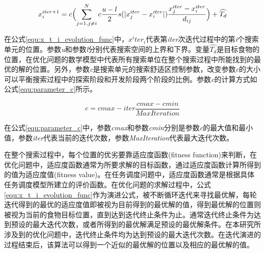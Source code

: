 \begin{equation}\label{equ:x_t_i_evolution_func}
    x^{iter+1}_i = c \Bigl(\sum_{j=1,j\neq{i}}^N c \frac{u-l}{2}s (\lvert x^{iter}_j-x^{iter}_i \rvert )\frac{x^{iter}_j-x^{iter}_i}{d_{ij}} \Bigr) + \widehat{T_d}
\end{equation}

在公式\ref{equ:x_t_i_evolution_func}中，$x^iter_i$代表第\emph{iter}次迭代过程中的第\emph{i}个搜索单元的位置。参数\emph{u}和参数\emph{l}分别代表搜索空间的上界和下界。变量$\widehat{T_d}$是目标食物的位置，在优化问题的数学模型中代表所有搜索单位在整个搜索过程中所能找到的最优的解的位置。另外，参数\emph{c}是搜索单元的搜索舒适区控制参数，改变参数\emph{c}的大小可以平衡搜索过程中的探索阶段和开发阶段两个阶段的比例。参数\emph{c}的计算方式如公式\ref{equ:parameter_c}所示。

\begin{equation}\label{equ:parameter_c}
    c = cmax - iter \frac{cmax - cmin}{MaxIteration}
\end{equation}


在公式\ref{equ:parameter_c}中，参数\emph{cmax}和参数\emph{cmin}分别是参数\emph{c}的最大值和最小值，参数\emph{iter}代表当前的迭代次数，参数\emph{MaxIteration}代表最大迭代次数。

在整个搜索过程中，每个位置的优劣要靠适应度函数(fitness function)来判断，在优化问题中，适应度函数通常为所要求解的目标函数，通过适应度函数计算所得到的值为适应度值(fitness value)。在任务调度问题中，适应度函数通常是根据具体任务调度模型所建立的评价函数。在优化问题的求解过程中，公式\ref{equ:x_t_i_evolution_func}作为演进公式，被不断循环迭代来寻找最优解，每轮迭代得到的最优的适应度值即被视为目前得到的最优解的值，得到最优解的位置则被视为当前的食物目标位置，直到达到迭代终止条件为止。通常迭代终止条件为达到预设的最大迭代次数，或者所得到的最优解满足预设的最优解条件。在本研究所涉及到的优化问题中，迭代终止条件均为达到预设的最大迭代次数。在迭代演进的过程结束后，该算法可以得到一个近似的最优解的位置以及相应的最优解的值。

